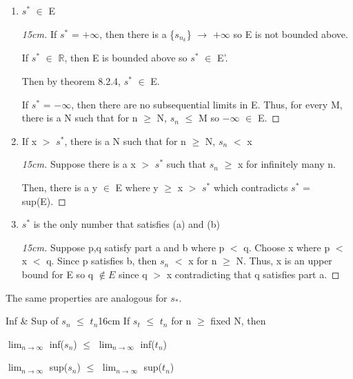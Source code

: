 	\begin{enumerate}[label=(\alph*), leftmargin=2cm, itemsep=0.1cm]
		\item $s^*$ $\in$ E

			\begin{proof}[15cm]
				If $s^*$ = $+\infty$, then there is a
				\{$s_{n_k}$\} $\rightarrow$ $+\infty$ so E is not bounded above.
				
				If $s^*$ $\in$ $\mathbb{R}$, then E is bounded above so
				$s^*$ $\in$ E'.

				Then by {\color{red} theorem 8.2.4}, $s^*$ $\in$ E.

				If $s^*$ = $-\infty$, then there are no subsequential limits
				in E.
				Thus, for every M, there is a N such that for n $\geq$ N,
				$s_n$ $\leq$ M so $-\infty$ $\in$ E.				
			\end{proof}

		\item If x $>$ $s^*$, there is a N such that for n $\geq$ N, $s_n$ $<$ x
		
			\begin{proof}[15cm]
				Suppose there is a x $>$ $s^*$ such that $s_n$ $\geq$ x
				for infinitely many n.

				Then, there is a y $\in$ E where y $\geq$ x $>$ $s^*$
				which contradicts $s^*$ = sup(E).
			\end{proof}

		\item $s^*$ is the only number that satisfies (a) and (b)
		
			\begin{proof}[15cm]
				Suppose p,q satisfy part a and b where p $<$ q.
				Choose x where p $<$ x $<$ q.
				Since p satisfies b, then $s_n$ $<$ x for n $\geq$ N.
				Thus, x is an upper bound for E so q $\not \in E$ since q $>$ x
				contradicting that q satisfies part a.
			\end{proof}
	\end{enumerate}

	\hspace{1cm}
	The same properties are analogous for $s_*$.

	\newpage



	\begin{wtheorem}{Inf \& Sup of $s_n$ $\leq$ $t_n$}{16cm}
		If $s_t$ $\leq$ $t_n$ for n $\geq$ fixed N, then

		\hspace{0.5cm}
		$\lim_{n \rightarrow \infty}$ inf($s_n$)
		$\leq$
		$\lim_{n \rightarrow \infty}$ inf($t_n$)

		\hspace{0.5cm}
		$\lim_{n \rightarrow \infty}$ sup($s_n$)
		$\leq$
		$\lim_{n \rightarrow \infty}$ sup($t_n$)
	\end{wtheorem}

